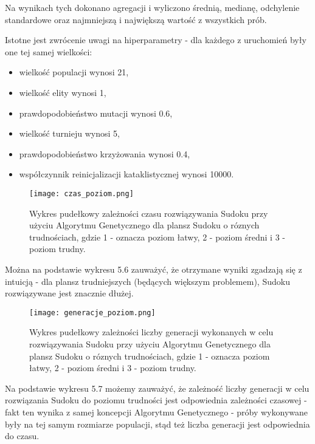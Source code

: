 \documentclass[11pt]{scrartcl} %
\begin{document}
Na wynikach tych dokonano agregacji i wyliczono średnią, medianę, odchylenie standardowe oraz najmniejszą i największą wartość z wszystkich prób.

Istotne jest zwrócenie uwagi na hiperparametry - dla każdego z uruchomień były one tej samej wielkości:
\begin{itemize}
    \item wielkość populacji wynosi 21,
    \item wielkość elity wynosi 1,
    \item prawdopodobieństwo mutacji wynosi 0.6,
    \item wielkość turnieju wynosi 5,
    \item prawdopodobieństwo krzyżowania wynosi 0.4,
    \item współczynnik reinicjalizacji kataklistycznej wynosi 10000.
\end{itemize}


\begin{figure}[h] %
        \centering
        \texttt{[image: czas\_poziom.png]} %
        \caption{Wykres pudełkowy zależności czasu rozwiązywania Sudoku przy użyciu Algorytmu Genetycznego dla plansz Sudoku o róznych trudnościach, gdzie 1 - oznacza poziom łatwy, 2 - poziom średni i 3 - poziom trudny. }
\end{figure}

Można na podstawie wykresu 5.6 zauważyć, że otrzymane wyniki zgadzają się z intuicją - dla plansz trudniejszych (będących większym problemem), Sudoku rozwiązywane jest znacznie dłużej.\\

\begin{figure}[h] %
        \centering
        \texttt{[image: generacje\_poziom.png]} %
        \caption{Wykres pudełkowy zależności liczby generacji wykonanych w celu rozwiązywania Sudoku przy użyciu Algorytmu Genetycznego dla plansz Sudoku o róznych trudnościach, gdzie 1 - oznacza poziom łatwy, 2 - poziom średni i 3 - poziom trudny. }
\end{figure}

Na podstawie wykresu 5.7 możemy zauważyć, że zależność liczby generacji w celu rozwiązania Sudoku do poziomu trudności jest odpowiednia zależności czasowej - fakt ten wynika z samej koncepcji Algorytmu Genetycznego - próby wykonywane były na tej samym rozmiarze populacji, stąd też liczba generacji jest odpowiednia do czasu.\\
\end{document}
